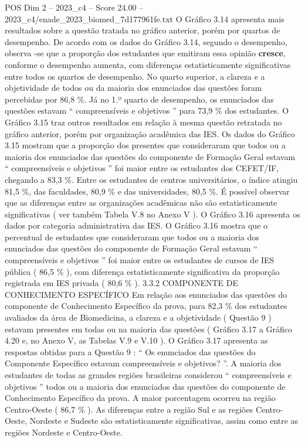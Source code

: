 \begin{textsample}{POS Dim 2 – 2023\_c4 – Score 24.00 – 2023\_c4/enade\_2023\_biomed\_7d177961fe.txt}
O Gráfico 3.14 apresenta mais resultados sobre a questão tratada no gráfico anterior, porém por quartos de desempenho.
De acordo com os dados do Gráfico 3.14, segundo o desempenho, observa -se que a proporção dos estudantes que emitiram essa opinião \textbf{cresce}, conforme o desempenho aumenta, com diferenças estatisticamente significativas entre todos os quartos de desempenho.
No quarto superior, a clareza e a objetividade de todos ou da maioria dos enunciados das questões foram percebidas por 86,8 \%.
Já no 1.º quarto de desempenho, os enunciados das questões estavam “ compreensíveis e objetivos ” para 73,9 \% dos estudantes.
O Gráfico 3.15 traz outros resultados em relação à mesma questão retratada no gráfico anterior, porém por organização acadêmica das IES.
Os dados do Gráfico 3.15 mostram que a proporção dos presentes que consideraram que todos ou a maioria dos enunciados das questões do componente de Formação Geral estavam “ compreensíveis e objetivos ” foi maior entre os estudantes dos CEFET/IF, chegando a 83,3 \%.
Entre os estudantes de centros universitários, o índice atingiu 81,5 \%, das faculdades, 80,9 \% e das universidades, 80,5 \%.
É possível observar que as diferenças entre as organizações acadêmicas não são estatisticamente significativas ( ver também Tabela V.8 no Anexo V ).
O Gráfico 3.16 apresenta os dados por categoria administrativa das IES.
O Gráfico 3.16 mostra que o percentual de estudantes que consideraram que todos ou a maioria dos enunciados das questões do componente de Formação Geral estavam “ compreensíveis e objetivos ” foi maior entre os estudantes de cursos de IES pública ( 86,5 \% ), com diferença estatisticamente significativa da proporção registrada em IES privada ( 80,6 \% ). 3.3.2 COMPONENTE DE CONHECIMENTO ESPECÍFICO Em relação aos enunciados das questões do componente de Conhecimento Específico da prova, para 82,3 \% dos estudantes avaliados da área de Biomedicina, a clareza e a objetividade ( Questão 9 ) estavam presentes em todas ou na maioria das questões ( Gráfico 3.17 a Gráfico 4.20 e, no Anexo V, as Tabelas V.9 e V.10 ).
O Gráfico 3.17 apresenta as respostas obtidas para a Questão 9 : “ Os enunciados das questões do Componente Específico estavam compreensíveis e objetivos? ”.
A maioria dos estudantes de todas as grandes regiões brasileiras considerou “ compreensíveis e objetivos ” todos ou a maioria dos enunciados das questões do componente de Conhecimento Específico da prova.
A maior porcentagem ocorreu na região Centro-Oeste ( 86,7 \% ).
As diferenças entre a região Sul e as regiões Centro-Oeste, Nordeste e Sudeste são estatisticamente significativas, assim como entre as regiões Nordeste e Centro-Oeste.

\end{textsample}
